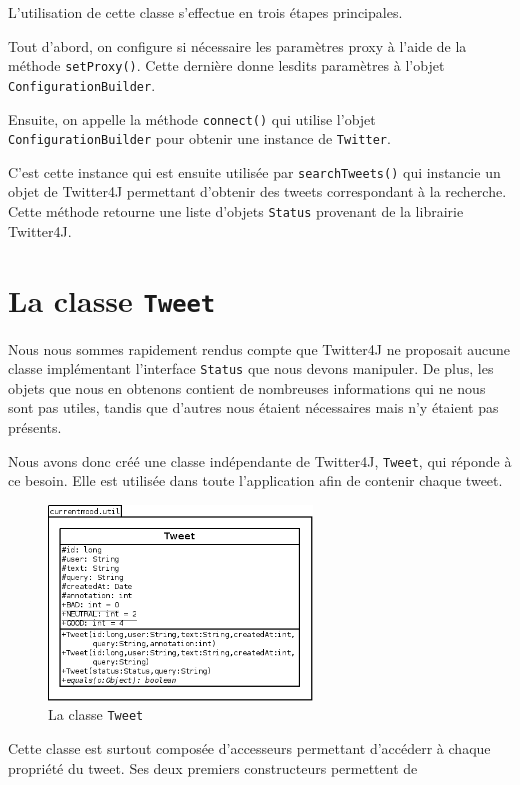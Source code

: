 \documentclass[12pt,a4paper]{report}
\begin{document}
L'utilisation de cette classe s'effectue en trois étapes principales.

Tout d'abord, on configure si nécessaire les paramètres proxy à l'aide de la
méthode \texttt{setProxy()}. Cette dernière donne lesdits paramètres à l'objet
\texttt{ConfigurationBuilder}.

Ensuite, on appelle la méthode \texttt{connect()} qui utilise l'objet
\texttt{ConfigurationBuilder} pour obtenir une instance de \texttt{Twitter}.

C'est cette instance qui est ensuite utilisée par \texttt{searchTweets()} qui
instancie un objet de Twitter4J permettant d'obtenir des tweets correspondant
à la recherche. Cette méthode retourne une liste d'objets \texttt{Status}
provenant de la librairie Twitter4J.

\section{La classe \texttt{Tweet}}

Nous nous sommes rapidement rendus compte que Twitter4J ne proposait aucune
classe implémentant l'interface \texttt{Status} que nous devons manipuler. De
plus, les objets que nous en obtenons contient de nombreuses informations qui ne
nous sont pas utiles, tandis que d'autres nous étaient nécessaires mais
n'y étaient pas présents.

Nous avons donc créé une classe indépendante de Twitter4J, \texttt{Tweet}, qui
réponde à ce besoin. Elle est utilisée dans toute l'application afin de contenir
chaque tweet.

\begin{figure}[b]
    \centering
    \includegraphics[width=7cm]{img/uml_tweet.png}
    \caption{La classe \texttt{Tweet}}
    \label{uml_tweet}
\end{figure}

Cette classe est surtout composée d'accesseurs permettant d'accéderr à chaque
propriété du tweet. Ses deux premiers constructeurs permettent de 
\end{document}
